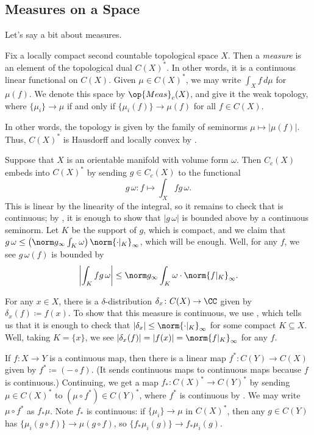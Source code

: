 \documentclass[../notes.tex]{subfiles}
\begin{document}
\subsection{Measures on a Space}
Let's say a bit about measures.
\begin{definition}[measure]
	Fix a locally compact second countable topological space $X$. Then a \textit{measure} is an element of the topological dual $C(X)^*$. In other words, it is a continuous linear functional on $C(X)$. Given $\mu\in C(X)^*$, we may write $\int_Xf\,d\mu$ for $\mu(f)$. We denote this space by $\op{Meas}_c(X)$, and give it the weak topology, where $\{\mu_i\}\to\mu$ if and only if $\{\mu_i(f)\}\to\mu(f)$ for all $f\in C(X)$.
\end{definition}
\begin{remark}
	In other words, the topology is given by the family of seminorms $\mu\mapsto\left|\mu(f)\right|$. Thus, $C(X)^*$ is Hausdorff and locally convex by .
\end{remark}
\begin{example}
	Suppose that $X$ is an orientable manifold with volume form $\omega$. Then $C_c(X)$ embeds into $C(X)^*$ by sending $g\in C_c(X)$ to the functional
	\[g\,\omega\colon f\mapsto\int_Xfg\,\omega.\]
	This is linear by the linearity of the integral, so it remains to check that is continuous; by , it is enough to show that $\left|g\,\omega\right|$ is bounded above by a continuous seminorm. Let $K$ be the support of $g$, which is compact, and we claim that $g\,\omega\le\left(\norm g_\infty\int_K\omega\right)\norm{\cdot|_K}_\infty$, which will be enough. Well, for any $f$, we see $g\,\omega(f)$ is bounded by
	\[\left|\int_Kfg\,\omega\right|\le\norm g_\infty\int_K\omega\cdot\norm{f|_K}_\infty.\]
\end{example}
\begin{example}
	For any $x\in X$, there is a $\delta$-distribution $\delta_x\colon C(X)\to\CC$ given by $\delta_x(f)\coloneqq f(x)$. To show that this measure is continuous, we use , which tells us that it is enough to check that $\left|\delta_x\right|\le\norm{\cdot|_K}_\infty$ for some compact $K\subseteq X$. Well, taking $K=\{x\}$, we see $\left|\delta_x(f)\right|=\left|f(x)\right|=\norm{f|_K}_\infty$ for any $f$.
\end{example}
\begin{example} \label{ex:push-dirac}
	If $f\colon X\to Y$ is a continuous map, then there is a linear map $f^*\colon C(Y)\to C(X)$ given by $f^*\coloneqq(-\circ f)$. (It sends continuous maps to continuous maps because $f$ is continuous.) Continuing, we get a map $f_*\colon C(X)^*\to C(Y)^*$ by sending $\mu\in C(X)^*$ to $(\mu\circ f^*)\in C(Y)^*$, where $f^*$ is continuous by . We may write $\mu\circ f^*$ as $f_*\mu$. Note $f_*$ is continuous: if $\{\mu_i\}\to\mu$ in $C(X)^*$, then any $g\in C(Y)$ has $\{\mu_i(g\circ f)\}\to\mu(g\circ f)$, so $\{f_*\mu_i(g)\}\to f_*\mu_i(g)$.
\end{example}
\end{document}
